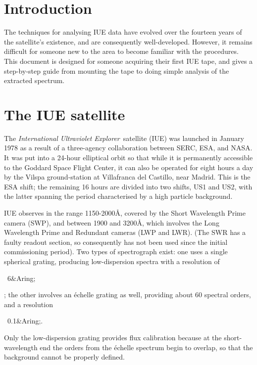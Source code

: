 \begin{latexonly}
   \setlength{\parskip}{0mm}
   \latexonlytoc
   \setlength{\parskip}{\medskipamount}
   \markright{\stardocname}
\end{latexonly}

\newpage

\section{Introduction}

The techniques for analysing IUE data have evolved over the fourteen
years of the satellite's existence, and are consequently well-developed.
However, it remains difficult for someone new to the area to become familiar
with the procedures. This document is designed for someone acquiring their
first IUE tape, and gives a step-by-step guide from mounting the tape to
doing simple analysis of the extracted spectrum.

\section{The IUE satellite}

The {\it International Ultraviolet Explorer}\, satellite (IUE) was launched in
January 1978 as a result of a three-agency collaboration between SERC, ESA,
and NASA\@. It was put into a 24-hour elliptical orbit so that while it is
permanently accessible to the Goddard Space Flight Center, it can also be
operated for eight hours a day by the Vilspa ground-station at Villafranca
del Castillo, near Madrid. This is the ESA shift; the remaining 16 hours are
divided into two shifts, US1 and US2, with the latter spanning the period
characterised by a high particle background.

\begin{htmlonly}
IUE observes in the range 1150-2000{\AA}, covered by the Short Wavelength Prime
camera (SWP), and between 1900 and 3200{\AA}, which involves the Long
Wavelength Prime and Redundant cameras (LWP and LWR). (The SWR has a faulty
readout section, so consequently has not been used since the initial
commissioning period). Two types of spectrograph exist: one uses a single
spherical grating, producing low-dispersion spectra with a resolution of
\begin{rawhtml}~6&Aring;\end{rawhtml}
; the other involves an \'{e}chelle grating as well, providing about
60 spectral orders, and a resolution 
\begin{rawhtml}~0.1&Aring;.\end{rawhtml}
Only the low-dispersion grating provides flux calibration because at the
short-wavelength end the orders from the \'{e}chelle spectrum begin to overlap,
so that the background cannot be properly defined.
\end{htmlonly}

